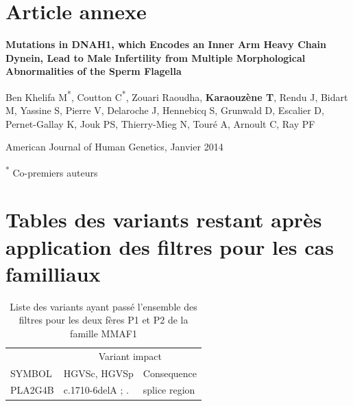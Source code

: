 \documentclass[12pt,a4paper,twoside]{ugathesis}
\theoremstyle{definition}
\theoremstyle{definition}
\theoremstyle{definition}
\theoremstyle{remark}
\begin{document}
\appendix

\hypertarget{dnah12014}{\chapter{Article annexe}\label{dnah12014}}

\textbf{Mutations in DNAH1, which Encodes an Inner Arm Heavy Chain
Dynein, Lead to Male Infertility from Multiple Morphological
Abnormalities of the Sperm Flagella}

Ben Khelifa M\textsuperscript{*}, Coutton C\textsuperscript{*}, Zouari
Raoudha, \textbf{Karaouzène T}, Rendu J, Bidart M, Yassine S, Pierre V,
Delaroche J, Hennebicq S, Grunwald D, Escalier D, Pernet-Gallay K, Jouk
PS, Thierry-Mieg N, Touré A, Arnoult C, Ray PF

American Journal of Human Genetics, Janvier 2014

\textsuperscript{*} Co-premiers auteurs

\newpage



\newpage

\newpage

\chapter{Tables des variants restant après application des filtres pour
les cas
familliaux}\label{tables-des-variants-restant-apres-application-des-filtres-pour-les-cas-familliaux}

\begin{longtable}[t]{lll}
\caption{\label{tab:tabmmaf1}Liste des variants ayant passé l'ensemble des filtres pour les deux fères P1 et P2 de la famille MMAF1}\\
\toprule
\multicolumn{1}{c}{ } & \multicolumn{2}{c}{Variant impact} \\
\cmidrule(l{2pt}r{2pt}){2-3}
SYMBOL & HGVSc, HGVSp & Consequence\\
\midrule
PLA2G4B & c.1710-6delA ; . & splice region\\
\bottomrule
\end{longtable}
\end{document}
